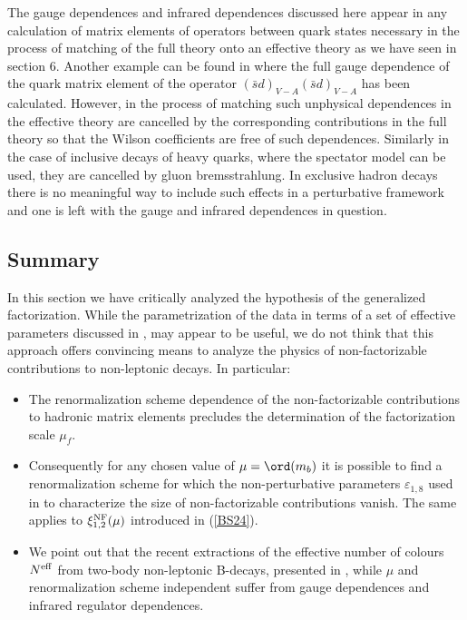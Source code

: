 The gauge dependences and infrared dependences discussed here 
appear in any calculation of matrix elements of operators
between quark states necessary in the process of matching of the
full theory onto an effective theory as we have seen in section 6.
 Another example can be
found in \cite{BJW90} where the full gauge dependence of the quark
matrix element of the operator $(\bar s d)_{V-A}(\bar s d)_{V-A}$
has been calculated. However, in the process of matching such
unphysical dependences in the effective theory are cancelled by
the corresponding contributions in the full theory so that the
Wilson coefficients are free of such dependences. Similarly
in the case of inclusive decays of heavy quarks, where the spectator
model can be used, they are cancelled by gluon
bremsstrahlung. In exclusive hadron decays there is no meaningful way to
include such effects in a perturbative framework and one is left
with the gauge and infrared dependences in question.

\subsection{Summary}
In this section we have critically analyzed the hypothesis of
the generalized factorization. While the parametrization of the data
in terms of a set of effective parameters discussed in
\cite{NS97,Cheng,GNF,AKL98},
 may appear to be useful,
we do not think that this approach offers convincing means to
analyze the physics of non-factorizable contributions to
non-leptonic decays. In particular:
\begin{itemize}
\item
The renormalization scheme dependence of the non-factorizable
contributions to hadronic matrix elements precludes the
determination of the factorization scale $\mu_f$.
\item
Consequently for any chosen value of $\mu=\ord(m_b)$ 
it is possible to find a renormalization
scheme for which the non-perturbative parameters $\varepsilon_{1,8}$
used in \cite{NS97} to characterize the size of non-factorizable
contributions vanish. The same applies to 
$\xi^{\rm NF}_{1,2}(\mu)$ introduced in (\ref{BS24}).
\item
We point out that the recent extractions of the effective number
of colours $N^{\rm eff}$ from two-body non-leptonic B-decays,
presented in \cite{Cheng,GNF,AKL98},
while $\mu$ and renormalization scheme independent suffer from
gauge dependences and infrared regulator dependences.
\end{itemize}

